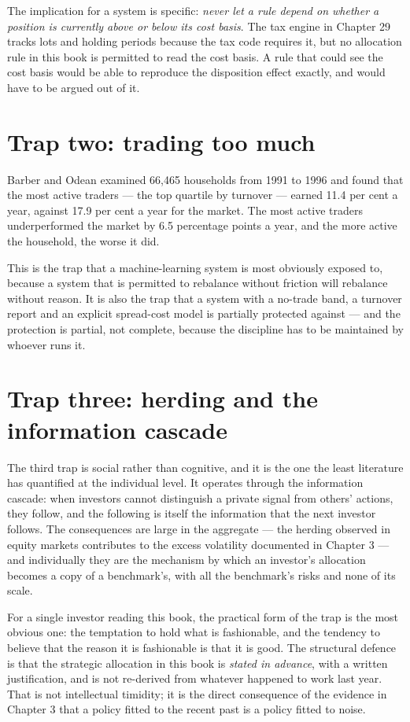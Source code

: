 The implication for a system is specific: \emph{never let a rule depend on
whether a position is currently above or below its cost basis}. The tax
engine in Chapter 29 tracks lots and holding periods because the tax code
requires it, but no allocation rule in this book is permitted to read the
cost basis. A rule that could see the cost basis would be able to reproduce
the disposition effect exactly, and would have to be argued out of it.

\section{Trap two: trading too much}

Barber and Odean examined 66,465 households from 1991 to 1996 and found
that the most active traders --- the top quartile by turnover --- earned
11.4 per cent a year, against 17.9 per cent a year for the market. The
most active traders underperformed the market by 6.5 percentage points a
year, and the more active the household, the worse it did.

This is the trap that a machine-learning system is most obviously exposed
to, because a system that is permitted to rebalance without friction will
rebalance without reason. It is also the trap that a system with a
no-trade band, a turnover report and an explicit spread-cost model is
partially protected against --- and the protection is partial, not
complete, because the discipline has to be maintained by whoever runs it.

\section{Trap three: herding and the information cascade}

The third trap is social rather than cognitive, and it is the one the
least literature has quantified at the individual level. It operates
through the information cascade: when investors cannot distinguish a
private signal from others' actions, they follow, and the following is
itself the information that the next investor follows. The consequences are
large in the aggregate --- the herding observed in equity markets
contributes to the excess volatility documented in Chapter 3 --- and
individually they are the mechanism by which an investor's allocation
becomes a copy of a benchmark's, with all the benchmark's risks and none of
its scale.

For a single investor reading this book, the practical form of the trap is
the most obvious one: the temptation to hold what is fashionable, and the
tendency to believe that the reason it is fashionable is that it is good.
The structural defence is that the strategic allocation in this book is
\emph{stated in advance}, with a written justification, and is not
re-derived from whatever happened to work last year. That is not
intellectual timidity; it is the direct consequence of the evidence in
Chapter 3 that a policy fitted to the recent past is a policy fitted to
noise.

